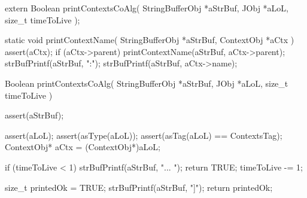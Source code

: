 \startCHeader
extern Boolean printContextsCoAlg(
  StringBufferObj *aStrBuf,
  JObj            *aLoL,
  size_t           timeToLive
);
\stopCHeader
{}

\startCCode
static void printContextName(
  StringBufferObj *aStrBuf,
  ContextObj      *aCtx
) {
  assert(aCtx);
  if (aCtx->parent) {
    printContextName(aStrBuf, aCtx->parent);
    strBufPrintf(aStrBuf, ":");
  }
  strBufPrintf(aStrBuf, aCtx->name);
}

Boolean printContextsCoAlg(
  StringBufferObj *aStrBuf,
  JObj            *aLoL,
  size_t           timeToLive
) {
  assert(aStrBuf);

  assert(aLoL);
  assert(asType(aLoL));
  assert(asTag(aLoL) == ContextsTag);
  ContextObj* aCtx = (ContextObj*)aLoL;

  if (timeToLive < 1) {
    strBufPrintf(aStrBuf, "... ");  
    return TRUE;
  }
  timeToLive -= 1;
  
  size_t printedOk = TRUE;
  strBufPrintf(aStrBuf, "\n[");
  printContextName(aStrBuf, aCtx);
  strBufPrintf(aStrBuf, "(");
  printLoL(aStrBuf, ((JObj*)aCtx->dict));
  lolPrintStr(aStrBuf, printedOk, asData(aLoL),
              ")[ d:( ", ") ", timeToLive);
  lolPrintStr(aStrBuf, printedOk, asCommand(aLoL),
              "c:( ", ") ", timeToLive);
  lolPrintStr(aStrBuf, printedOk, asProcess(aLoL),
              "p:( ", ") ", timeToLive);
  lolPrintStr(aStrBuf, printedOk, asMessages(aLoL),
              "m:( ", ") ", timeToLive);
  lolPrintStr(aStrBuf, printedOk, asListeners(aLoL),
              "l:( ", ") ", timeToLive);
  strBufPrintf(aStrBuf, " ]]\n");
  return printedOk;
}
\stopCCode

\startTestSuite[registerContexts]

